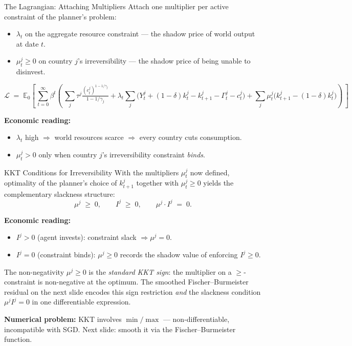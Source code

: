 \documentclass[aspectratio=169,11pt]{beamer}
\newcommand{\emphc}[1]{\textcolor{harvardcrimson}{#1}}
\begin{document}
\begin{frame}{The Lagrangian: Attaching Multipliers}
\footnotesize
Attach one multiplier per active constraint of the planner's problem:
\begin{itemize}\itemsep2pt
    \item $\lambda_t$ on the aggregate resource constraint --- the \emphc{shadow price of world output} at date $t$.
    \item $\mu_t^j \geq 0$ on country $j$'s irreversibility --- the \emphc{shadow price of being unable to disinvest}.
\end{itemize}

\[
\mathcal{L} \;=\; \mathbb{E}_0\!\left[\,\sum_{t=0}^{\infty} \beta^{t}\!\left(\,
  \sum_{j} \tau^j \tfrac{(c_t^j)^{1-1/\gamma_j}}{1-1/\gamma_j}
  + \lambda_t\!\sum_{j}\!\bigl(Y_t^j + (1-\delta) k_t^j - k_{t+1}^j - \Gamma_t^j - c_t^j\bigr)
  + \sum_{j}\! \mu_t^j \bigl(k_{t+1}^j - (1-\delta) k_t^j\bigr)
\right)\,\right]
\]

\smallskip
\textbf{Economic reading:}
\begin{itemize}\itemsep1pt
    \item $\lambda_t$ high $\Rightarrow$ world resources scarce $\Rightarrow$ every country cuts consumption.
    \item $\mu_t^j > 0$ only when country $j$'s irreversibility constraint \emph{binds}.
\end{itemize}
\end{frame}

\begin{frame}{KKT Conditions for Irreversibility}
With the multipliers $\mu_t^j$ now defined, optimality of the planner's choice of $k_{t+1}^j$ together with $\mu_t^j \geq 0$ yields the \emphc{complementary slackness} structure:
\[
\mu^j \;\geq\; 0, \qquad I^j \;\geq\; 0, \qquad \mu^j \cdot I^j \;=\; 0.
\]

\smallskip
\textbf{Economic reading:}
\begin{itemize}\itemsep2pt
    \item $I^j > 0$ (agent invests): constraint slack $\Rightarrow \mu^j = 0$.
    \item $I^j = 0$ (constraint binds): $\mu^j \geq 0$ records the shadow value of enforcing $I^j \geq 0$.
\end{itemize}

\vspace{0.2em}
{\footnotesize The non-negativity $\mu^j \geq 0$ is the \emph{standard KKT sign}: the multiplier on a $\geq$-constraint is non-negative at the optimum.  The smoothed Fischer--Burmeister residual on the next slide encodes this sign restriction \emph{and} the slackness condition $\mu^j I^j = 0$ in one differentiable expression.}

\vspace{0.3em}
\textbf{Numerical problem:} KKT involves $\min/\max$ --- \emphc{non-differentiable}, incompatible with SGD. Next slide: smooth it via the Fischer--Burmeister function.
\end{frame}
\end{document}
